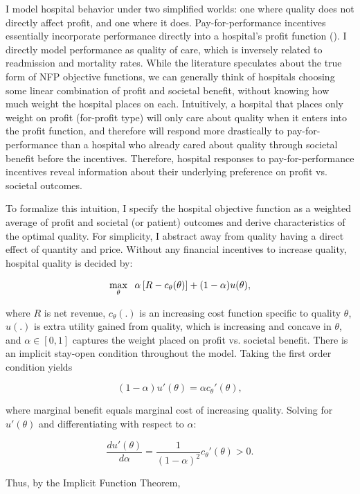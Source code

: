 \documentclass[12pt]{article}
\begin{document}
    I model hospital behavior under two simplified worlds: one where quality does not directly affect profit, and one where it does. Pay-for-performance incentives essentially incorporate performance directly into a hospital's profit function (\cite{dranove2011health}). I directly model performance as quality of care, which is inversely related to readmission and mortality rates. While the literature speculates about the true form of NFP objective functions, we can generally think of hospitals choosing some linear combination of profit and societal benefit, without knowing how much weight the hospital places on each. Intuitively, a hospital that places only weight on profit (for-profit type) will only care about quality when it enters into the profit function, and therefore will respond more drastically to pay-for-performance than a hospital who already cared about quality through societal benefit before the incentives. Therefore, hospital responses to pay-for-performance incentives reveal information about their underlying preference on profit vs. societal outcomes. 

    To formalize this intuition, I specify the hospital objective function as a weighted average of profit and societal (or patient) outcomes and derive characteristics of the optimal quality. For simplicity, I abstract away from quality having a direct effect of quantity and price. Without any financial incentives to increase quality, hospital quality is decided by:  
    
    $$\max_{\theta}\hspace{2mm}\alpha\left[R - c_{\theta}(\theta) \right] + (1-\alpha) u(\theta),$$

    \noindent where $R$ is net revenue, $c_{\theta}(.)$ is an increasing cost function specific to quality $\theta$, $u(.)$ is extra utility gained from quality, which is increasing and concave in $\theta$, and $\alpha\in[0,1]$ captures the weight placed on profit vs. societal benefit. There is an implicit stay-open condition throughout the model. Taking the first order condition yields 

    $$(1-\alpha)u'(\theta) = \alpha c_{\theta}'(\theta),$$

    \noindent where marginal benefit equals marginal cost of increasing quality. Solving for $u'(\theta)$ and differentiating with respect to $\alpha$:

    $$\frac{du'(\theta)}{d\alpha} = \frac{1}{(1-\alpha)^2}c_{\theta}'(\theta) > 0.$$

    \noindent Thus, by the Implicit Function Theorem, 
\end{document}
